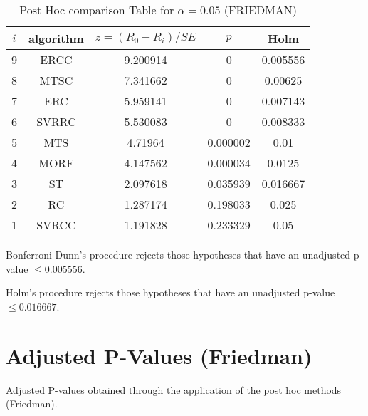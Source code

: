 \documentclass[a4paper,10pt]{article}
\begin{document}
\begin{landscape}
\begin{table}[!htp]
\centering\footnotesize
\begin{tabular}{ccccc}
$i$&algorithm&$z=(R_0 - R_i)/SE$&$p$&Holm \\
\hline9&ERCC&9.200914&0&0.005556\\8&MTSC&7.341662&0&0.00625\\7&ERC&5.959141&0&0.007143\\6&SVRRC&5.530083&0&0.008333\\5&MTS&4.71964&0.000002&0.01\\4&MORF&4.147562&0.000034&0.0125\\3&ST&2.097618&0.035939&0.016667\\2&RC&1.287174&0.198033&0.025\\1&SVRCC&1.191828&0.233329&0.05\\\hline
\end{tabular}
\caption{Post Hoc comparison Table for $\alpha=0.05$ (FRIEDMAN)}
\end{table}Bonferroni-Dunn's procedure rejects those hypotheses that have an unadjusted p-value $\le0.005556$.

Holm's procedure rejects those hypotheses that have an unadjusted p-value $\le0.016667$.


\newpage

\section{Adjusted P-Values (Friedman)}


Adjusted P-values obtained through the application of the post hoc methods (Friedman).


\end{landscape}
\end{document}

